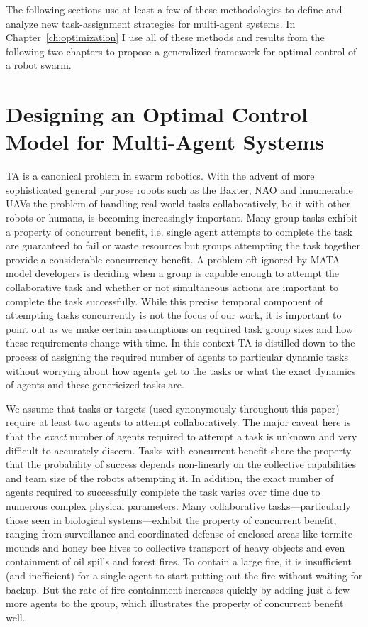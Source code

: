 \documentclass[defaultstyle,12pt]{thesis}
\begin{document}
The following sections use at least a few of these methodologies to define and analyze new task-assignment strategies for multi-agent systems. In Chapter~\ref{ch:optimization} I use all of these methods and results from the following two chapters to propose a generalized framework for optimal control of a robot swarm.


\chapter{Designing an Optimal Control Model for Multi-Agent Systems}\label{ch:model}
TA is a canonical problem in swarm robotics. With the advent of more sophisticated general purpose robots such as the Baxter, NAO and innumerable UAVs the problem of handling real world tasks collaboratively, be it with other robots or humans, is becoming increasingly important. Many group tasks exhibit a property of concurrent benefit, i.e. single agent attempts to complete the task are guaranteed to fail or waste resources but groups attempting the task together provide a considerable concurrency benefit. A problem oft ignored by MATA model developers is deciding when a group is capable enough to attempt the collaborative task and whether or not simultaneous actions are important to complete the task successfully. While this precise temporal component of attempting tasks concurrently is not the focus of our work, it is important to point out as we make certain assumptions on required task group sizes and how these requirements change with time. In this context TA is distilled down to the process of assigning the required number of agents to particular dynamic tasks without worrying about how agents get to the tasks or what the exact dynamics of agents and these genericized tasks are. 

We assume that tasks or targets (used synonymously throughout this paper) require at least two agents to attempt collaboratively. The major caveat here is that the \emph{exact} number of agents required to attempt a task is unknown and very difficult to accurately discern. Tasks with concurrent benefit share the property that the probability of success depends non-linearly on the collective capabilities and team size of the robots attempting it. In addition, the exact number of agents required to successfully complete the task varies over time due to numerous  complex physical parameters. Many collaborative tasks---particularly those seen in biological systems---exhibit the property of concurrent benefit, ranging from surveillance and coordinated defense of enclosed areas like termite mounds and honey bee hives \cite{breed1990division} to collective transport of heavy objects and even containment of oil spills and forest fires. To contain a large fire, it is insufficient (and inefficient) for a single agent to start putting out the fire without waiting for backup. But the rate of fire containment increases quickly by adding just a few more agents to the group, which illustrates the property of concurrent benefit well.
\end{document}
